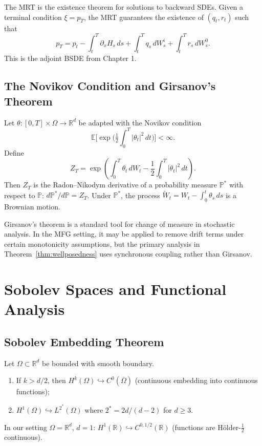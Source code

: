 \begin{remark}
The MRT is the existence theorem for solutions to backward SDEs. Given a terminal
condition $\xi = p_T$, the MRT guarantees the existence of $(q_t, r_t)$ such that
\[
    p_T = p_t - \int_t^T \partial_x H_s\, ds + \int_t^T q_s\, dW_s^i + \int_t^T r_s\,
    dW_s^0.
\]
This is the adjoint BSDE from Chapter 1.
\end{remark}

\subsection{The Novikov Condition and Girsanov's Theorem}

\begin{theorem}
\label{thm:girsanov}
Let $\theta : [0,T] \times \Omega \to \mathbb{R}^d$ be adapted with the Novikov
condition
\[
    \mathbb{E}\Big[\exp\big(\tfrac{1}{2}\textstyle\int_0^T |\theta_t|^2\, dt\big)\Big] < \infty.
\]
Define
\[
    Z_T = \exp\left( \int_0^T \theta_t\, dW_t - \frac{1}{2}\int_0^T |\theta_t|^2\, dt
    \right).
\]
Then $Z_T$ is the Radon--Nikodym derivative of a probability measure $\mathbb{P}^*$
with respect to $\mathbb{P}$: $d\mathbb{P}^*/d\mathbb{P} = Z_T$. Under $\mathbb{P}^*$,
the process $\widetilde{W}_t = W_t - \int_0^t \theta_s\, ds$ is a Brownian motion.
\end{theorem}

\begin{remark}
Girsanov's theorem is a standard tool for change of measure in stochastic analysis. In
the MFG setting, it may be applied to remove drift terms under certain monotonicity
assumptions, but the primary analysis in Theorem~\ref{thm:wellposedness} uses synchronous coupling rather
than Girsanov.
\end{remark}


\section{Sobolev Spaces and Functional Analysis}
\label{sec:mp-sobolev}

\subsection{Sobolev Embedding Theorem}

\begin{theorem}
\label{thm:sobolev-embedding}
Let $\Omega \subset \mathbb{R}^d$ be bounded with smooth boundary.
\begin{enumerate}[label=(\roman*)]
    \item If $k > d/2$, then $H^k(\Omega) \hookrightarrow C^0(\bar\Omega)$ (continuous
    embedding into continuous functions);
    \item $H^1(\Omega) \hookrightarrow L^{2^*}(\Omega)$ where $2^* = 2d/(d-2)$ for
    $d \geq 3$.
\end{enumerate}
In our setting $\Omega = \mathbb{R}^d$, $d=1$: $H^1(\mathbb{R}) \hookrightarrow
C^{0,1/2}(\mathbb{R})$ (functions are H\"older-$\tfrac{1}{2}$ continuous).
\end{theorem}


